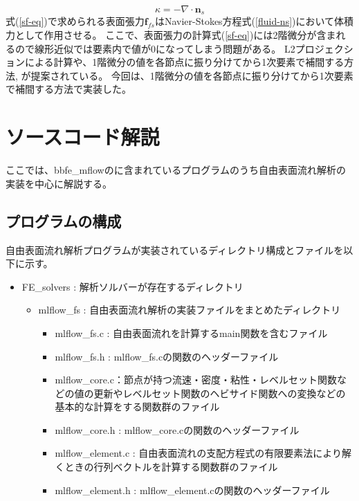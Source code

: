\documentclass[8pt,a4paper]{article}
\newcommand{\bm}{\boldsymbol}
\begin{document}
\begin{equation}
\label{sf-kappa}
	\kappa = - \nabla \cdot \bm{n}_{s}
\end{equation}
式(\ref{sf-eq})で求められる表面張力$\bm{f}_{fs}$はNavier-Stokes方程式(\ref{fluid-ns})において体積力として作用させる。
ここで、表面張力の計算式(\ref{sf-eq})には2階微分が含まれるので線形近似では要素内で値が0になってしまう問題がある。
L2プロジェクションによる計算\cite{Nagrath2003}や、1階微分の値を各節点に振り分けてから1次要素で補間する方法\cite{Matsumoto2006}, \cite{Shi2019}が提案されている。
今回は、1階微分の値を各節点に振り分けてから1次要素で補間する方法で実装した。

\newpage
\section{ソースコード解説}
ここでは、bbfe\_mflowのに含まれているプログラムのうち自由表面流れ解析の実装を中心に解説する。

\subsection{プログラムの構成}
自由表面流れ解析プログラムが実装されているディレクトリ構成とファイルを以下に示す。

\begin{itemize}
	\item FE\_solvers : 解析ソルバーが存在するディレクトリ
  \begin{itemize}
    \item mlflow\_fs : 自由表面流れ解析の実装ファイルをまとめたディレクトリ
    \begin{itemize}
    	\item mlflow\_fs.c : 自由表面流れを計算するmain関数を含むファイル
    	\item mlflow\_fs.h : mlflow\_fs.cの関数のヘッダーファイル
    	\item mlflow\_core.c：節点が持つ流速・密度・粘性・レベルセット関数などの値の更新やレベルセット関数のヘビサイド関数への変換などの基本的な計算をする関数群のファイル
    	\item mlflow\_core.h : mlflow\_core.cの関数のヘッダーファイル
    	\item mlflow\_element.c : 自由表面流れの支配方程式の有限要素法により解くときの行列ベクトルを計算する関数群のファイル
    	\item mlflow\_element.h : mlflow\_element.cの関数のヘッダーファイル
    \end{itemize}
  \end{itemize}
\end{itemize}
\end{document}
